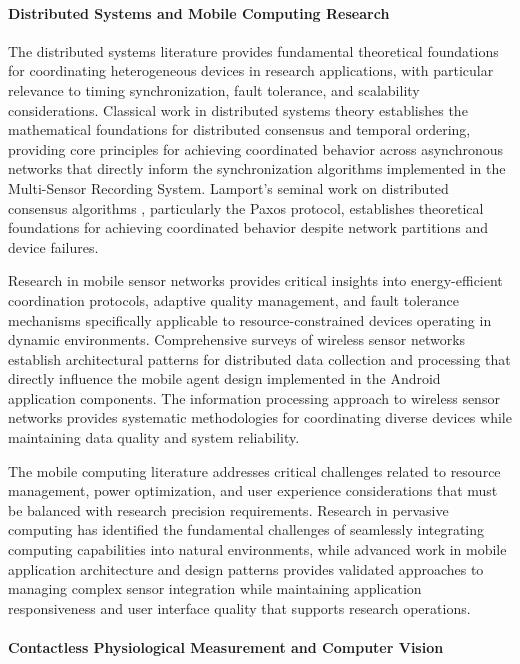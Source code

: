 \documentclass[12pt,a4paper]{report}
\begin{document}
\paragraph{Distributed Systems and Mobile Computing Research}

The distributed systems literature provides fundamental theoretical foundations for coordinating heterogeneous devices
in research applications, with particular relevance to timing synchronization, fault tolerance, and scalability
considerations. Classical work in distributed systems theory establishes the mathematical foundations for distributed
consensus and temporal ordering, providing core principles for achieving coordinated behavior across asynchronous
networks that directly inform the synchronization algorithms implemented in the Multi-Sensor Recording System. Lamport's
seminal work on distributed consensus algorithms \cite{lamport1978time,lamport1998part}, particularly the Paxos protocol, establishes theoretical foundations
for achieving coordinated behavior despite network partitions and device failures.

Research in mobile sensor networks provides critical insights into energy-efficient coordination protocols, adaptive
quality management, and fault tolerance mechanisms specifically applicable to resource-constrained devices operating in
dynamic environments. Comprehensive surveys of wireless sensor networks establish architectural patterns for distributed
data collection and processing that directly influence the mobile agent design implemented in the Android application
components. The information processing approach to wireless sensor networks provides systematic methodologies for
coordinating diverse devices while maintaining data quality and system reliability.

The mobile computing literature addresses critical challenges related to resource management, power optimization, and
user experience considerations that must be balanced with research precision requirements. Research in pervasive
computing has identified the fundamental challenges of seamlessly integrating computing capabilities into natural
environments, while advanced work in mobile application architecture and design patterns provides validated approaches
to managing complex sensor integration while maintaining application responsiveness and user interface quality that
supports research operations.

\paragraph{Contactless Physiological Measurement and Computer Vision}
\end{document}
